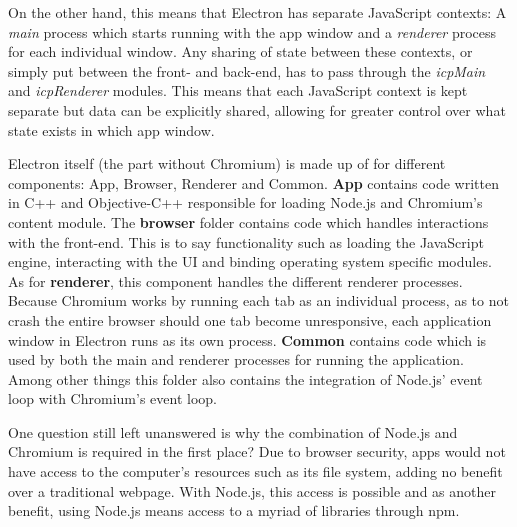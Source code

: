 On the other hand, this means that Electron has separate JavaScript contexts: A \emph{main} process which starts running
with the app window and a \emph{renderer} process for each individual window.
Any sharing of state between these contexts, or simply put between the front- and back-end, has to pass through the
\emph{icpMain} and \emph{icpRenderer} modules.
This means that each JavaScript context is kept separate but data can be explicitly shared, allowing for greater control
over what state exists in which app window.\cite{jensen2017}\par
Electron itself (the part without Chromium) is made up of for different components: App, Browser, Renderer and Common.
\textbf{App} contains code written in C++ and Objective-C++ responsible for loading Node.js and Chromium's content module.
The \textbf{browser} folder contains code which handles interactions with the front-end.
This is to say functionality such as loading the JavaScript engine, interacting with the UI and binding operating system
specific modules.
As for \textbf{renderer}, this component handles the different renderer processes.
Because Chromium works by running each tab as an individual process, as to not crash the entire browser should one
tab become unresponsive, each application window in Electron runs as its own process.
\textbf{Common} contains code which is used by both the main and renderer processes for running the application.
Among other things this folder also contains the integration of Node.js' event loop with Chromium's event loop.\cite{jensen2017}\par
One question still left unanswered is why the combination of Node.js and Chromium is required in the first place?
Due to browser security, apps would not have access to the computer's resources such as its file system, adding no
benefit over a traditional webpage.
With Node.js, this access is possible and as another benefit, using Node.js means access to a myriad of libraries
through npm.
